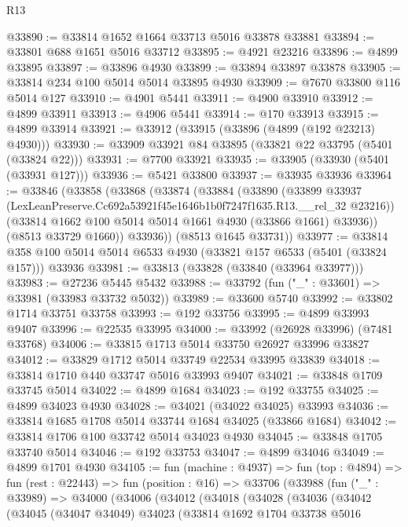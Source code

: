\begin{lexlean}{R13}
\begin{coremodule}
@33890 := @33814 @1652 @1664 @33713 @5016 @33878 @33881
@33894 := @33801 @688 @1651 @5016 @33712
@33895 := @4921 @23216
@33896 := @4899 @33895
@33897 := @33896 @4930
@33899 := @33894 @33897 @33878
@33905 := @33814 @234 @100 @5014 @5014 @33895 @4930
@33909 := @7670 @33800 @116 @5014 @127
@33910 := @4901 @5441
@33911 := @4900 @33910
@33912 := @4899 @33911
@33913 := @4906 @5441
@33914 := @170 @33913
@33915 := @4899 @33914
@33921 := @33912 (@33915 (@33896 (@4899 (@192 @23213) @4930)))
@33930 := @33909 @33921 @84 @33895 (@33821 @22 @33795 (@5401 (@33824 @22)))
@33931 := @7700 @33921
@33935 := @33905 (@33930 (@5401 (@33931 @127)))
@33936 := @5421 @33800
@33937 := @33935 @33936
@33964 := @33846
    (@33858
      (@33868
        (@33874
          (@33884
            (@33890
              (@33899
                @33937
                (LexLeanPreserve.Cc692a53921f45e1646b1b0f7247f1635.R13.__rel_32 @23216))
              (@33814 @1662 @100 @5014 @5014 @1661 @4930 (@33866 @1661) @33936))
            (@8513 @33729 @1660))
          @33936))
      (@8513 @1645 @33731))
@33977 := @33814 @358 @100 @5014 @5014 @6533 @4930 (@33821 @157 @6533 (@5401 (@33824 @157))) @33936
@33981 := @33813 (@33828 (@33840 (@33964 @33977)))
@33983 := @27236 @5445 @5432
@33988 := @33792 (fun ("_" : @33601) => @33981 (@33983 @33732 @5032))
@33989 := @33600 @5740
@33992 := @33802 @1714 @33751 @33758
@33993 := @192 @33756
@33995 := @4899 @33993 @9407
@33996 := @22535 @33995
@34000 := @33992 (@26928 @33996) (@7481 @33768)
@34006 := @33815 @1713 @5014 @33750 @26927 @33996 @33827
@34012 := @33829 @1712 @5014 @33749 @22534 @33995 @33839
@34018 := @33814 @1710 @440 @33747 @5016 @33993 @9407
@34021 := @33848 @1709 @33745 @5014
@34022 := @4899 @1684
@34023 := @192 @33755
@34025 := @4899 @34023 @4930
@34028 := @34021 (@34022 @34025) @33993
@34036 := @33814 @1685 @1708 @5014 @33744 @1684 @34025 (@33866 @1684)
@34042 := @33814 @1706 @100 @33742 @5014 @34023 @4930
@34045 := @33848 @1705 @33740 @5014
@34046 := @192 @33753
@34047 := @4899 @34046
@34049 := @4899 @1701 @4930
@34105 := fun (machine : @4937) =>
  fun (top : @4894) =>
  fun (rest : @22443) =>
  fun (position : @16) =>
  @33706
    (@33988
      (fun ("_" : @33989) =>
      @34000
        (@34006
          (@34012
            (@34018
              (@34028
                (@34036
                  (@34042
                    (@34045
                      (@34047 @34049)
                      @34023
                      (@33814
                        @1692
                        @1704
                        @33738
                        @5016

\end{coremodule}
\end{lexlean}
